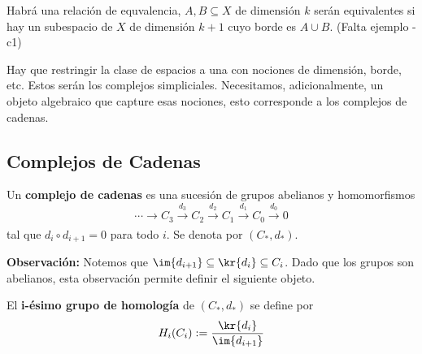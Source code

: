 \documentclass{article}
\begin{document}
\vspace{2mm}
\noindent Habrá una relación de equvalencia, $A,B\subseteq X$ de dimensión $k$ serán equivalentes
si hay un subespacio de $X$ de dimensión $k+1$ cuyo borde es $A\cup B$. (Falta ejemplo - c1)

\vspace{2mm}
\noindent Hay que restringir la clase de espacios a una con nociones de dimensión, borde, etc. 
Estos serán los complejos simpliciales. Necesitamos, adicionalmente, un objeto algebraico que 
capture esas nociones, esto corresponde a los complejos de cadenas.

\subsection{Complejos de Cadenas}
\begin{dfn}
    Un \textbf{complejo de cadenas} es una sucesión de grupos abelianos y homomorfismos
    \begin{equation*}
        \cdots\xrightarrow[]{}C_{3}\xrightarrow[]{d_{3}}C_{2}\xrightarrow[]{d_{2}}
        C_{1}\xrightarrow[]{d_{1}}C_{0}\xrightarrow[]{d_{0}}0
    \end{equation*}
    tal que $d_{i}\circ d_{i+1}=0$ para todo $i$. Se denota por $(C_{*},d_{*})$.
\end{dfn}
\noindent\textbf{Observación:} Notemos que $\im{d_{i+1}}\subseteq\kr{d_{i}}\subseteq C_{i}$. Dado 
que los grupos son abelianos, esta observación permite definir el siguiente objeto.

\vspace{2mm}
\begin{dfn}
    El \textbf{i-ésimo grupo de homología} de $(C_{*},d_{*})$ se define por
    \begin{equation*}
        H_{i}(C_{i}):=\frac{\kr{d_{i}}}{\im{d_{i+1}}}
    \end{equation*}
\end{dfn}
\end{document}
